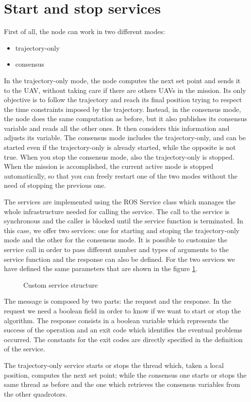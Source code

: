 \section{Start and stop services\label{sec:start_stop_services}}

First of all, the node can work in two different modes:
\begin{itemize}
  \item trajectory-only
  \item consensus
\end{itemize}

In the trajectory-only mode, the node computes the next set point and sends it to
the UAV, without taking care if there are others UAVs in the mission. Its only objective
is to follow the trajectory and reach its final position trying to respect the time
constraints imposed by the trajectory.
Instead, in the consensus mode, the node does the same computation as before, but
it also publishes its consensus variable and reads all the other ones.
It then considers this information and adjusts its variable.
The consensus mode includes the trajectory-only, and can be started even if the
trajectory-only is already started, while the opposite is not true. When you stop
the consensus mode, also the trajectory-only is stopped.
When the mission is accomplished, the current active mode is stopped automatically,
so that you can freely restart one of the two modes without the need of stopping
the previous one.

The services are implemented using the ROS Service class which manages the whole
infrastructure needed for calling the service. The call to the service is
synchronous and the caller is blocked until the service function is terminated.
In this case, we offer two services: one for starting and stoping the trajectory-only
mode and the other for the consensus mode.
It is possible to customize the service call in order to pass different number
and types of arguments to the service function and the response can also be
defined.
For the two services we have defined the same parameters that are shown in the figure
\ref{fig:custom_service}.

\begin{figure}[h]
\centering
  
\caption{Custom service structure}
\label{fig:custom_service}
\end{figure}

The message is composed by two parts: the request and the response.
In the request we need a boolean field in order to know if
we want to start or stop the algorithm. The response consists in a boolean variable
which represents the success of the operation and an exit code which identifies
the eventual problems occurred. The constants for the exit codes are directly specified
in the definition of the service.

The trajectory-only service starts or stops the thread which, taken a local position,
computes the next set point; while the consensus one starts or stops the same
thread as before and the one which retrieves the consensus variables from the other
quadrotors.
